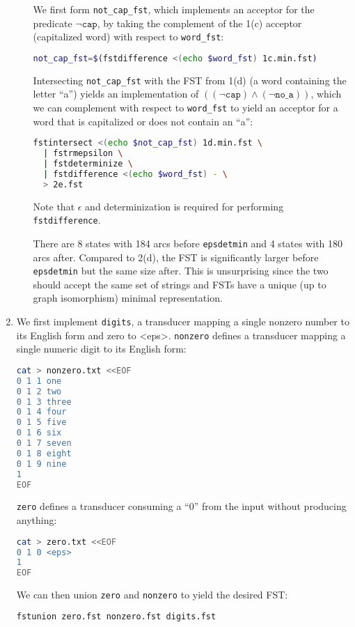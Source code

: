 \documentclass[a4paper,oneside,reqno]{amsart}
\begin{document}
\begin{enumerate}[label=\arabic*.]
\begin{enumerate}[label=(\alph*)]
        We first form \texttt{not\_cap\_fst}, which implements an acceptor for
        the predicate $\lnot \texttt{cap}$, by taking the complement of the
        1(c) acceptor (capitalized word) with respect to \texttt{word\_fst}:
        \begin{lstlisting}[language=bash]
not_cap_fst=$(fstdifference <(echo $word_fst) 1c.min.fst)
        \end{lstlisting}

        Intersecting \texttt{not\_cap\_fst} with the FST from 1(d) (a word
        containing the letter ``a'') yields an implementation of $((\lnot
        \texttt{cap}) \land (\lnot \texttt{no\_a}))$, which we can complement
        with respect to \texttt{word\_fst} to yield an acceptor for a word that
        is capitalized or does not contain an ``a'':
        \begin{lstlisting}[language=bash]
fstintersect <(echo $not_cap_fst) 1d.min.fst \
  | fstrmepsilon \
  | fstdeterminize \
  | fstdifference <(echo $word_fst) - \
  > 2e.fst
        \end{lstlisting}
        Note that $\epsilon$ and determinization is required for
        performing \texttt{fstdifference}.

        There are 8 states with 184 arcs before \texttt{epsdetmin} and 4 states
        with 180 arcs after. Compared to 2(d), the FST is significantly larger
        before \texttt{epsdetmin} but the same size after. This is unsurprising
        since the two should accept the same set of strings and FSTs have a
        unique (up to graph isomorphism) minimal representation.
    \end{enumerate}

  \item We first implement \texttt{digits}, a transducer mapping a single
    nonzero number to its English form and zero to <eps>. \texttt{nonzero}
    defines a transducer mapping a single numeric digit to its English form:
    \begin{lstlisting}[language=bash]
cat > nonzero.txt <<EOF
0 1 1 one
0 1 2 two
0 1 3 three
0 1 4 four
0 1 5 five
0 1 6 six
0 1 7 seven
0 1 8 eight
0 1 9 nine
1
EOF
    \end{lstlisting}
    \texttt{zero} defines a transducer consuming a ``0'' from the input
    without producing anything:
    \begin{lstlisting}[language=bash]
cat > zero.txt <<EOF
0 1 0 <eps>
1
EOF
    \end{lstlisting}
    We can then union \texttt{zero} and \texttt{nonzero} to yield
    the desired FST:
    \begin{lstlisting}[language=bash]
fstunion zero.fst nonzero.fst digits.fst
    \end{lstlisting}


\end{enumerate}
\end{document}

